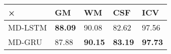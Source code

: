 \documentclass[varwidth=true, border=10pt, convert={size=640x}]{standalone}
\begin{document}
\begin{table}
\begin{center}
\begin{tabular}{lllll}\toprule
× & GM & WM & CSF & ICV\\ \midrule
MD-LSTM  & \textbf{88.09}  & 90.08 & 82.62  & 97.56 \\ 
MD-GRU & 87.88 & \textbf{90.15 } & \textbf{83.19} & \textbf{97.73 }\\ \bottomrule
\end{tabular}
\label{feasibilityquantitative}
\end{center}
\end{table}
\end{document}
